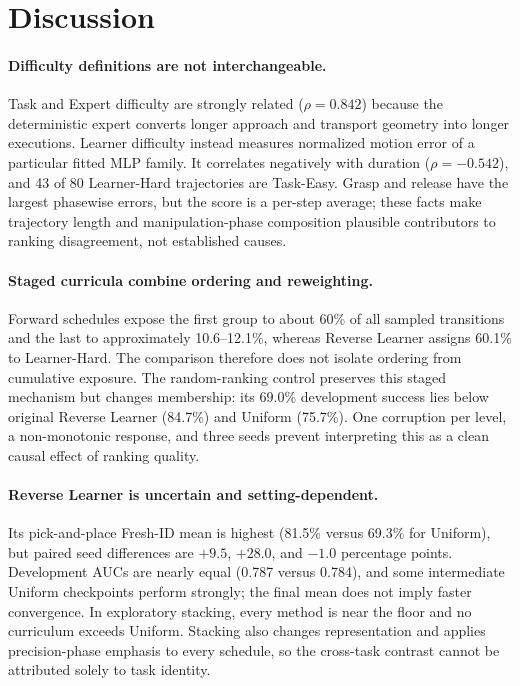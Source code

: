 \section{Discussion}
\label{sec:discussion}

\paragraph{Difficulty definitions are not interchangeable.}
Task and Expert difficulty are strongly related ($\rho=0.842$) because the
deterministic expert converts longer approach and transport geometry into
longer executions. Learner difficulty instead measures normalized motion error
of a particular fitted MLP family. It correlates negatively with duration
($\rho=-0.542$), and 43 of 80 Learner-Hard trajectories are Task-Easy. Grasp
and release have the largest phasewise errors, but the score is a per-step
average; these facts make trajectory length and manipulation-phase composition
plausible contributors to ranking disagreement, not established causes.

\paragraph{Staged curricula combine ordering and reweighting.}
Forward schedules expose the first group to about 60\% of all sampled
transitions and the last to approximately 10.6--12.1\%, whereas Reverse
Learner assigns 60.1\% to Learner-Hard. The comparison therefore does not
isolate ordering from cumulative exposure. The random-ranking control
preserves this staged mechanism but changes membership: its 69.0\% development
success lies below original Reverse Learner (84.7\%) and Uniform (75.7\%). One corruption per
level, a non-monotonic response, and three seeds prevent interpreting this as
a clean causal effect of ranking quality.

\paragraph{Reverse Learner is uncertain and setting-dependent.}
Its pick-and-place Fresh-ID mean is highest (81.5\% versus 69.3\% for
Uniform), but paired seed differences are $+9.5$, $+28.0$, and $-1.0$
percentage points. Development AUCs are nearly equal (0.787 versus 0.784), and
some intermediate Uniform checkpoints perform strongly; the final mean does
not imply faster convergence. In exploratory stacking, every method is near
the floor and no curriculum exceeds Uniform. Stacking also changes
representation and applies precision-phase emphasis to every schedule, so the
cross-task contrast cannot be attributed solely to task identity.

